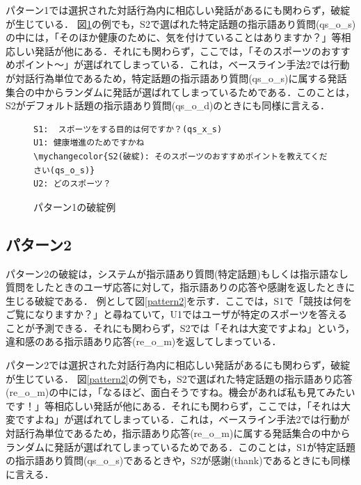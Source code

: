 \documentclass[12pt,a4paper,twoside,openany]{jbook}
\newcommand\mychangecolor[1]{\textcolor[rgb]{1,0,0}{\textbf{#1}}}
\begin{document}
パターン1では選択された対話行為内に相応しい発話があるにも関わらず，破綻が生じている．
図\ref{pattern1}の例でも，S2で選ばれた特定話題の指示語あり質問(qs\_o\_s)の中には，「そのほか健康のために、気を付けていることはありますか？」等相応しい発話が他にある．それにも関わらず，ここでは，「そのスポーツのおすすめポイント～」が選ばれてしまっている．これは，ベースライン手法2では行動が対話行為単位であるため，特定話題の指示語あり質問(qs\_o\_s)に属する発話集合の中からランダムに発話が選ばれてしまっているためである．このことは，S2がデフォルト話題の指示語あり質問(qs\_o\_d)のときにも同様に言える．


\begin{figure}[tb]
\begin{screen}
\centering
\begin{Verbatim}[commandchars=\\\{\}]
S1:  スポーツをする目的は何ですか？(qs_x_s)
U1: 健康増進のためですかね
\mychangecolor{S2(破綻): そのスポーツのおすすめポイントを教えてください(qs_o_s)}
U2: どのスポーツ？ 
\end{Verbatim}
\end{screen}
\caption{パターン1の破綻例}
\label{pattern1}
\end{figure}


\subsection*{パターン2}%


パターン2の破綻は，システムが指示語あり質問(特定話題)もしくは指示語なし質問をしたときのユーザ応答に対して，指示語ありの応答や感謝を返したときに生じる破綻である．
例として図\ref{pattern2}を示す．ここでは，S1で「競技は何をご覧になりますか？」と尋ねていて，U1ではユーザが特定のスポーツを答えることが予測できる．それにも関わらず，S2では「それは大変ですよね」という，違和感のある指示語あり応答(re\_o\_m)を返してしまっている．

パターン2では選択された対話行為内に相応しい発話があるにも関わらず，破綻が生じている．
図\ref{pattern2}の例でも，S2で選ばれた特定話題の指示語あり応答(re\_o\_m)の中には，「なるほど、面白そうですね。機会があれば私も見てみたいです！」等相応しい発話が他にある．それにも関わらず，ここでは，「それは大変ですよね」が選ばれてしまっている．これは，ベースライン手法2では行動が対話行為単位であるため，指示語あり応答(re\_o\_m)に属する発話集合の中からランダムに発話が選ばれてしまっているためである．このことは，S1が特定話題の指示語あり質問(qs\_o\_s)であるときや，S2が感謝(thank)であるときにも同様に言える．
\end{document}
